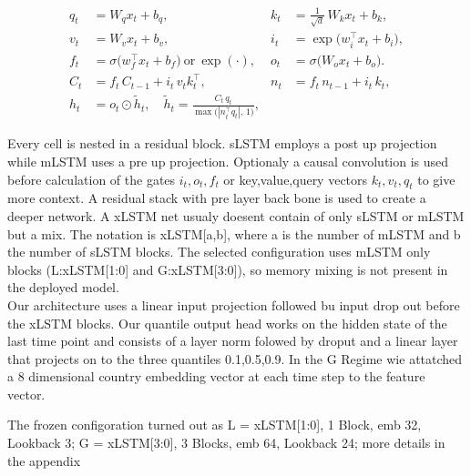 \begin{align}

  q_t &= W_q x_t + b_q, &

  k_t &= \tfrac{1}{\sqrt{d}}\,W_k x_t + b_k, \label{eq:mlstm-qk}\\

  v_t &= W_v x_t + b_v, &

  i_t &= \exp\!\big(w_i^\top x_t + b_i\big), \label{eq:mlstm-vi}\\

  f_t &= \sigma\!\big(w_f^\top x_t + b_f\big)\ \text{or}\ \exp(\cdot), &

  o_t &= \sigma\!\big(W_o x_t + b_o\big). \label{eq:mlstm-fo}\\

  C_t &= f_t\,C_{t-1} + i_t\,v_t k_t^\top, &

  n_t &= f_t\,n_{t-1} + i_t\,k_t, \label{eq:mlstm-Cn}\\

  h_t &= o_t\odot\tilde{h}_t,\quad

        \tilde{h}_t = \frac{C_t\,q_t}{\max\!\big(|n_t^\top q_t|,\,1\big)}, &&  \label{eq:mlstm-h}

\end{align}



Every cell is nested in a residual block. sLSTM employs a post up projection while mLSTM uses a pre up projection. Optionaly a causal convolution is used before calculation of the gates $i_t,o_t,f_t$ or key,value,query vectors $k_t,v_t,q_t$ to give more context. A residual stack with pre layer back bone is used to create a deeper network. A xLSTM net usualy doesent contain of only sLSTM or mLSTM but a mix. The notation is xLSTM[a,b], where a is the number of mLSTM and b the number of sLSTM blocks. The selected configuration uses mLSTM only blocks (L:xLSTM[1:0] and G:xLSTM[3:0]), so memory mixing is not present in the deployed model. \\

Our architecture uses a linear input projection followed bu input drop out before the xLSTM blocks. Our quantile output head works on the hidden state of the last time point and consists of a layer norm folowed by droput and a linear layer that projects on to the three quantiles {0.1,0.5,0.9}. In the G Regime wie attatched a 8 dimensional country embedding vector at each time step to the feature vector.

The frozen configoration turned out as L = xLSTM[1:0], 1 Block, emb 32, Lookback 3; G = xLSTM[3:0], 3 Blocks, emb 64, Lookback 24; more details in the appendix



